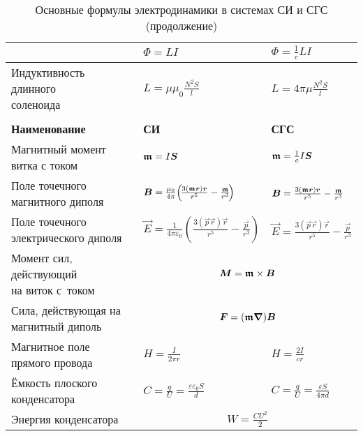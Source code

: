 \begin{labsupplement}
\begin{longtable}{p{40mm}p{30mm}p{30mm}}
        & $\Phi=LI$	&    $\Phi=\frac{1}{c}LI$	\bigstrut\\ \hline
\parbox{40mm}{Индуктивность длинного\\[-2.5pt] соленоида}
        & $L=\mu\mu_0\frac{N^2S}{l}$    &   $L=4\pi\mu \frac{N^2S}{l}$	\bigstrut\\ \hline
\newpage
\caption[]{Основные формулы электродинамики в системах СИ и СГС (продолжение)}  \\
\toprule[1pt]
\textbf{Наименование} & \textbf{СИ} & \textbf{СГС} \\
\midrule[1pt]
\parbox{40mm}{Магнитный момент\\[-2.5pt] витка с током}
        & ${\boldsymbol{\mathfrak{m}  }}=I{\boldsymbol{S}}$		&   ${\boldsymbol{\mathfrak{m}  }}=\frac{1}{c}I{\boldsymbol{S}}$	\bigstrut\\ \hline
\parbox{40mm}{Поле точечного\\[-2.5pt] магнитного диполя}
        & ${\boldsymbol{B}}=\frac{\mu_0}{4\pi}\!\left(\!\frac{3({\boldsymbol{\mathfrak{m}}}{\boldsymbol{r}}){\boldsymbol{r}}}{r^5}-\frac{{\boldsymbol{\mathfrak{m}}}}{r^3}\!\right)$
        & ${\boldsymbol{B}}=\frac{3({\boldsymbol{\mathfrak{m}}}{\boldsymbol{r}}){\boldsymbol{r}}}{r^5}-\frac{{\boldsymbol{\mathfrak{m}}}}{r^3}$ \bigstrut\\ \hline
\parbox{40mm}{Поле точечного\\[-2.5pt] электрического диполя}
        & $\vec{E}=\frac{1}{4\pi\varepsilon_0}\!\left(\!\frac{3(\vec{p}\vec{r})\vec{r}}{r^5}-\frac{\vec{p}}{r^3}\!\right)$
        & $\vec{E}=\frac{3(\vec{p}\vec{r})\vec{r}}{r^5}-\frac{\vec{p}}{r^3}$ \bigstrut\\ \hline
\parbox{40mm}{Момент сил, действующий\\[-2.5pt] на виток с~током}
        & \bigstrut\\ \hline
\parbox{40mm}{Сила, действующая на\\[-2.5pt] магнитный диполь}
        &  \bigstrut\\ \hline
\parbox{40mm}{Магнитное поле\\[-2.pt] прямого провода}
    & $H = \frac{I}{2\pi r}$ & $H=\frac{2I}{cr}$ \bigstrut \\ \hline
\parbox{40mm}{Ёмкость плоского\\[-2.5pt] конденсатора}
        & $C=\frac{q}{U}=\frac{\varepsilon\varepsilon_0S}{d}$
        & $C=\frac{q}{U}=\frac{\varepsilon S}{4\pi d}$ \bigstrut \\ \hline
Энергия конденсатора
        &  \bigstrut\\
\bottomrule[1pt]
\end{longtable}
\endgroup


\end{labsupplement}
